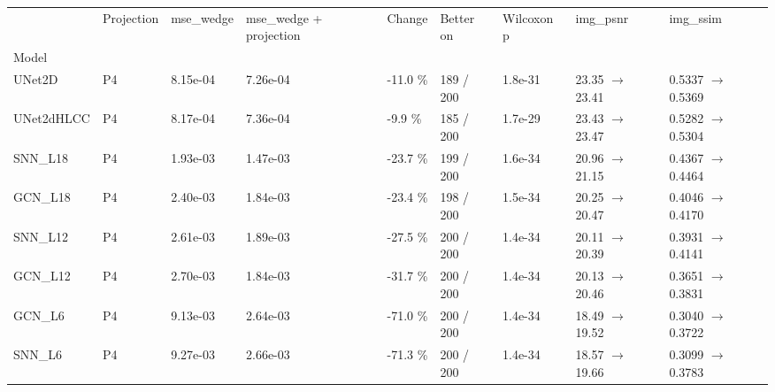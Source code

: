 \begin{tabular}{lllllllll}
\toprule
 & Projection & mse\_wedge & mse\_wedge + projection & Change & Better on & Wilcoxon p & img\_psnr & img\_ssim \\
Model &  &  &  &  &  &  &  &  \\
\midrule
UNet2D & P4 & 8.15e-04 & 7.26e-04 & -11.0 \% & 189 / 200 & 1.8e-31 & 23.35 $\rightarrow$ 23.41 & 0.5337 $\rightarrow$ 0.5369 \\
UNet2dHLCC & P4 & 8.17e-04 & 7.36e-04 & -9.9 \% & 185 / 200 & 1.7e-29 & 23.43 $\rightarrow$ 23.47 & 0.5282 $\rightarrow$ 0.5304 \\
SNN\_L18 & P4 & 1.93e-03 & 1.47e-03 & -23.7 \% & 199 / 200 & 1.6e-34 & 20.96 $\rightarrow$ 21.15 & 0.4367 $\rightarrow$ 0.4464 \\
GCN\_L18 & P4 & 2.40e-03 & 1.84e-03 & -23.4 \% & 198 / 200 & 1.5e-34 & 20.25 $\rightarrow$ 20.47 & 0.4046 $\rightarrow$ 0.4170 \\
SNN\_L12 & P4 & 2.61e-03 & 1.89e-03 & -27.5 \% & 200 / 200 & 1.4e-34 & 20.11 $\rightarrow$ 20.39 & 0.3931 $\rightarrow$ 0.4141 \\
GCN\_L12 & P4 & 2.70e-03 & 1.84e-03 & -31.7 \% & 200 / 200 & 1.4e-34 & 20.13 $\rightarrow$ 20.46 & 0.3651 $\rightarrow$ 0.3831 \\
GCN\_L6 & P4 & 9.13e-03 & 2.64e-03 & -71.0 \% & 200 / 200 & 1.4e-34 & 18.49 $\rightarrow$ 19.52 & 0.3040 $\rightarrow$ 0.3722 \\
SNN\_L6 & P4 & 9.27e-03 & 2.66e-03 & -71.3 \% & 200 / 200 & 1.4e-34 & 18.57 $\rightarrow$ 19.66 & 0.3099 $\rightarrow$ 0.3783 \\
\bottomrule
\end{tabular}
